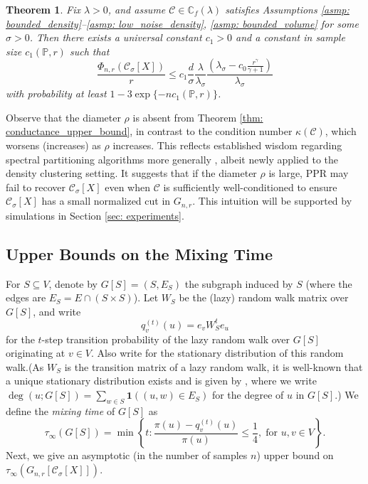 \documentclass[11pt,twoside]{article}
\newtheorem{theorem}{Theorem}
\newcommand{\set}[1]{\left\{#1\right\}}
\newcommand{\vol}{\mathrm{vol}}
\newcommand{\1}{\mathbf{1}}
\newcommand{\Xbf}{X}             %
\newcommand{\Wbf}{W}
\newcommand{\Pbb}{\mathbb{P}}
\newcommand{\Cbb}{\mathbb{C}}
\newcommand{\Cset}{\mathcal{C}}
\newcommand{\Csig}{\Cset_{\sigma}}
\begin{document}
\begin{theorem}
  \label{thm: conductance_upper_bound}
  Fix $\lambda > 0$, and assume $\Cset \in \Cbb_f(\lambda)$ satisfies
  Assumptions \ref{asmp: bounded_density}--\ref{asmp: low_noise_density}, 
  \ref{asmp: bounded_volume} for some $\sigma > 0$. Then there exists a universal constant $c_1 > 0$ and a constant in sample size $c_1(\Pbb,r)$ such that
  \begin{equation}
    \label{eqn: conductance_additive_error_bound}
    \frac{\Phi_{n,r}(\Csig[\Xbf])}{r} \leq c_1 \frac{d}{\sigma}
    \frac{\lambda}{\lambda_{\sigma}} \frac{(\lambda_{\sigma} -
      c_0\frac{r^{\gamma}}{\gamma+1})}{\lambda_{\sigma}}
  \end{equation}
  with probability at least $1 - 3\exp\{-nc_1(\Pbb,r)\}$. 
\end{theorem}
Observe that the diameter $\rho$ is absent from Theorem \ref{thm:
    conductance_upper_bound}, in contrast to the condition number
  $\kappa(\Cset)$, which worsens (increases) as $\rho$ increases. This
  reflects established wisdom regarding spectral partitioning
  algorithms more generally \citep{guattery1995, hein2010}, albeit newly applied
  to the density clustering setting. It suggests that if the diameter $\rho$ is
  large, PPR may fail to recover $\Csig[\Xbf]$ even when $\Cset$ is
  sufficiently well-conditioned to ensure $\Csig[\Xbf]$ has a small normalized
  cut in $G_{n,r}$. This intuition will be supported by simulations in Section
  \ref{sec: experiments}. 

\subsection{Upper Bounds on the Mixing Time} 
For $S \subseteq V$, denote by $G[S] = (S, E_S)$ the
subgraph induced by $S$ (where the edges are $E_S = E \cap (S \times S)$). Let
$\Wbf_S$ be the (lazy) random walk matrix over $G[S]$, and write  
$$
q_{v}^{(t)}(u) = e_v\Wbf_S^t e_u
$$
for the $t$-step transition probability of the lazy random walk over $G[S]$
originating at $v \in V$. Also write 
for the stationary distribution of this random walk.(As
$\Wbf_S$ is the transition matrix of a lazy random walk, 
it is well-known that a unique stationary distribution exists and is given by 
\smash{$\pi(u) = \deg(u;G[S])/\vol(S; G[S])$}, where we write $\deg(u;G[S]) = \sum_{w \in S} \1((u,w) \in E_S)$ for the degree of $u$ in $G[S]$.) We define the \emph{mixing time} of $G[S]$ as
\begin{equation}
\label{eqn: mixing_time}
\tau_{\infty}(G[S]) = \min\set{ t: \frac{\pi(u) - q_{v}^{(t)}(u)}
  {\pi(u)} \leq \frac{1}{4}, \; \text{for $u,v \in V$}}. 
\end{equation}
Next, we give an asymptotic (in the number of samples $n$) upper bound on
$\tau_{\infty}(G_{n,r}[\Csig[\Xbf]])$.  
\end{document}
